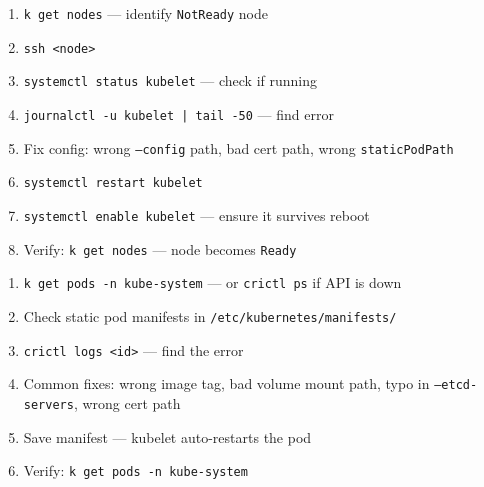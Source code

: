 \begin{tcbitemize}[
  raster columns=2, raster equal height=rows,
  blanker, cheat subtitle
]
  \tcbitem
    \begin{tcbitemize}[
      raster columns=1, raster equal height=rows,
      blanker, cheat subtitle
    ]
      \tcbitem
        {\fontsize{6.5}{7.5}\selectfont\sffamily
        \begin{enumerate}[leftmargin=1.2em, itemsep=0pt, parsep=0pt, topsep=1pt]
          \item \texttt{k get nodes} — identify \texttt{NotReady} node
          \item \texttt{ssh <node>}
          \item \texttt{systemctl status kubelet} — check if running
          \item \texttt{journalctl -u kubelet | tail -50} — find error
          \item Fix config: wrong \texttt{--config} path, bad cert path, wrong \texttt{staticPodPath}
          \item \texttt{systemctl restart kubelet}
          \item \texttt{systemctl enable kubelet} — ensure it survives reboot
          \item Verify: \texttt{k get nodes} — node becomes \texttt{Ready}
        \end{enumerate}}

      \tcbitem
          {\fontsize{6.5}{7.5}\selectfont\sffamily
          \begin{enumerate}[leftmargin=1.2em, itemsep=0pt, parsep=0pt, topsep=1pt]
            \item \texttt{k get pods -n kube-system} — or \texttt{crictl ps} if API is down
            \item Check static pod manifests in \texttt{/etc/kubernetes/manifests/}
            \item \texttt{crictl logs <id>} — find the error
            \item Common fixes: wrong image tag, bad volume mount path, typo in \texttt{--etcd-servers}, wrong cert path
            \item Save manifest — kubelet auto-restarts the pod
            \item Verify: \texttt{k get pods -n kube-system}
          \end{enumerate}}


\end{tcbitemize}
\end{tcbitemize}
